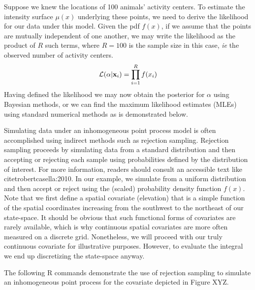 Suppose we knew the locations of 100 animals' activity
centers. To estimate the intensity surface $\mu(x)$ underlying these points, we
need to derive the likelihood for our data under this model. Given the
pdf $f(x)$, if we assume that the points are
mutually independent of one another, we may write
the likelihood as the product
of $R$ such terms, where $R=100$ is the sample size in this case,
\emph{ie} the observed number of activity centers.
\[
\mathcal{L}({\bf \alpha} | {\bf x}_i) = \prod_{i=1}^R f(x_i)
\]
Having defined the likelihood we may now obtain the posterior for
$\alpha$ using Bayesian methods, or we can find the maximum likelihood
estimates (MLEs) using standard numerical methods as is demonstrated
below.

Simulating data under an inhomogeneous point process model is often
accomplished using indirect methods such as rejection
sampling. Rejection sampling proceeds by
simulating data from a standard distribution and then accepting or
rejecting each sample using probabilities defined by the distribution
of interest. For more information, readers should consult an
accessible text like citet{robertcasella:2010}. In our example, we
simulate from a uniform distribution and then accept or reject using
the (scaled) probability density function $f(x)$. Note that we first define a
spatial covariate (elevation) that is a simple function of the spatial
coordinates increasing from the southwest to the northeast of our
state-space. It should be obvious that such functional forms of
covariates are rarely available, which is why continuous spatial
covariates are more often measured on a discrete grid. Nonetheless, we
will proceed with our truly continuous covariate for illustrative
purposes. However, to evaluate the integral we end up discretizing the
state-space anyway.


The following R commands demonstrate the use of rejection sampling to
simulate an inhomogeneous point process for the covariate depicted in
Figure XYZ.



